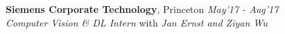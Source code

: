 \documentclass[margin,line]{res}
\newenvironment{list2}{
  \begin{list}{$\bullet$}{%
      \setlength{\itemsep}{0in}
      \setlength{\parsep}{0in} \setlength{\parskip}{0in}
      \setlength{\topsep}{0in} \setlength{\partopsep}{0in} 
      \setlength{\leftmargin}{0.2in}}}{\end{list}}
\begin{document}
\begin{resume}
{\bf Siemens Corporate Technology}, Princeton \hfill  {\em May'17 - Aug'17}\\
{\em Computer Vision \& DL Intern} with  {\em Jan Ernst and Ziyan Wu}


\end{resume}
\end{document}
